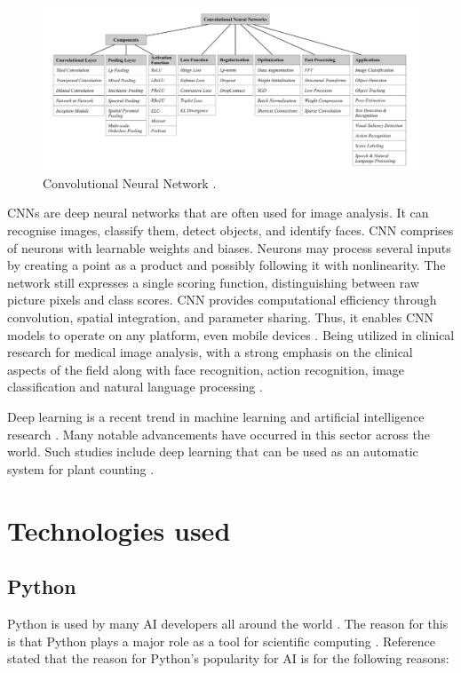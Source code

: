 \documentclass[conference]{IEEEtran}
\begin{document}
\begin{figure}[h]
    \centering
    \includegraphics[width=\linewidth]{CNN_Components.png}
    \caption{Convolutional Neural Network \cite{b6}.}
    \label{figCNN}
\end{figure}

CNNs are deep neural networks that are often used for image analysis.  It can recognise images, classify them, detect objects, and identify faces. CNN comprises of neurons with learnable weights and biases. Neurons may process several inputs by creating a point as a product and possibly following it with nonlinearity. The network still expresses a single scoring function, distinguishing between raw picture pixels and class scores.  CNN provides computational efficiency through convolution, spatial integration, and parameter sharing. Thus, it enables CNN models to operate on any platform, even mobile devices \cite{b26}. Being utilized in clinical research for medical image analysis, with a strong emphasis on the clinical aspects of the field \cite{b25} along with face recognition, action recognition, image classification and natural language processing \cite{b24}.

Deep learning is a recent trend in machine learning and artificial intelligence research \cite{b27}. Many notable advancements have occurred in this sector across the world. Such studies include deep learning that can be used as an automatic system for plant counting \cite{b28}\cite{b29}.

\section{Technologies used}

\subsection{Python}

Python is used by many AI developers all around the world \cite{b8}. The reason for this is that Python plays a major role as a tool for scientific computing \cite{b8}. Reference \cite{b8} stated that the reason for Python's popularity for AI is for the following reasons:
\end{document}
